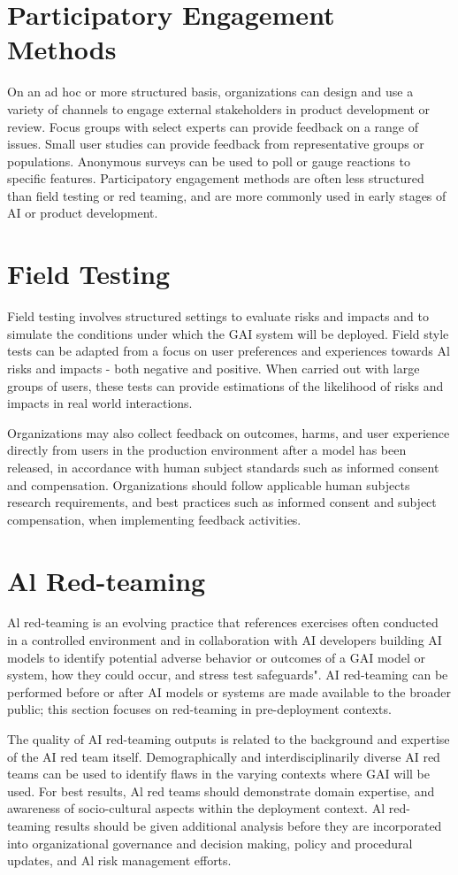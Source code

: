 \documentclass[10pt]{article}
\begin{document}
\section*{Participatory Engagement Methods}
On an ad hoc or more structured basis, organizations can design and use a variety of channels to engage external stakeholders in product development or review. Focus groups with select experts can provide feedback on a range of issues. Small user studies can provide feedback from representative groups or populations. Anonymous surveys can be used to poll or gauge reactions to specific features. Participatory engagement methods are often less structured than field testing or red teaming, and are more commonly used in early stages of AI or product development.
\section*{Field Testing}
Field testing involves structured settings to evaluate risks and impacts and to simulate the conditions under which the GAI system will be deployed. Field style tests can be adapted from a focus on user preferences and experiences towards Al risks and impacts - both negative and positive. When carried out with large groups of users, these tests can provide estimations of the likelihood of risks and impacts in real world interactions.

Organizations may also collect feedback on outcomes, harms, and user experience directly from users in the production environment after a model has been released, in accordance with human subject standards such as informed consent and compensation. Organizations should follow applicable human subjects research requirements, and best practices such as informed consent and subject compensation, when implementing feedback activities.
\section*{Al Red-teaming}
Al red-teaming is an evolving practice that references exercises often conducted in a controlled environment and in collaboration with AI developers building AI models to identify potential adverse behavior or outcomes of a GAI model or system, how they could occur, and stress test safeguards". AI red-teaming can be performed before or after AI models or systems are made available to the broader public; this section focuses on red-teaming in pre-deployment contexts.

The quality of AI red-teaming outputs is related to the background and expertise of the AI red team itself. Demographically and interdisciplinarily diverse AI red teams can be used to identify flaws in the varying contexts where GAI will be used. For best results, Al red teams should demonstrate domain expertise, and awareness of socio-cultural aspects within the deployment context. Al red-teaming results should be given additional analysis before they are incorporated into organizational governance and decision making, policy and procedural updates, and Al risk management efforts.
\end{document}
